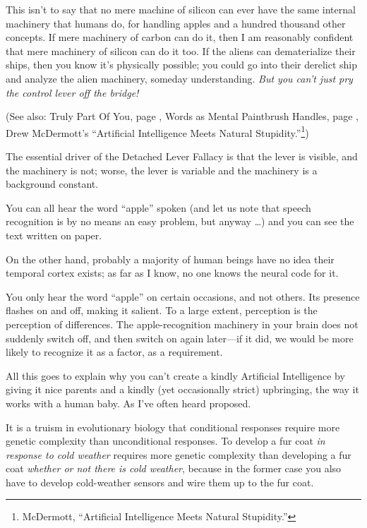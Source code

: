{
 This isn't to say that no mere machine of silicon
can ever have the same internal machinery that humans do, for handling
apples and a hundred thousand other concepts. If mere machinery of
carbon can do it, then I am reasonably confident that mere machinery of
silicon can do it too. If the aliens can dematerialize their ships,
then you know it's physically possible; you could go
into their derelict ship and analyze the alien machinery, someday
understanding. \textit{But you can't just pry the
control lever off the bridge!}}

{
 (See also: Truly Part Of You, page \pageref{truly_part_of_you}, Words as Mental Paintbrush Handles, page \pageref{words_as_mental_paintbrush_handles},
Drew McDermott's ``Artificial
Intelligence Meets Natural
Stupidity.''\footnote{McDermott, ``Artificial Intelligence Meets
Natural Stupidity.''})}

{
 The essential driver of the Detached Lever Fallacy is that the
lever is visible, and the machinery is not; worse, the lever is
variable and the machinery is a background constant.}

{
 You can all hear the word
``apple'' spoken (and let us note
that speech recognition is by no means an easy problem, but anyway
\ldots) and you can see the text written on paper.}

{
 On the other hand, probably a majority of human beings have no
idea their temporal cortex exists; as far as I know, no one knows the
neural code for it.}

{
 You only hear the word
``apple'' on certain occasions, and
not others. Its presence flashes on and off, making it salient. To a
large extent, perception is the perception of differences. The
apple-recognition machinery in your brain does not suddenly switch off,
and then switch on again later---if it did, we would be more likely to
recognize it as a factor, as a requirement.}

{
 All this goes to explain why you can't create a
kindly Artificial Intelligence by giving it nice parents and a kindly
(yet occasionally strict) upbringing, the way it works with a human
baby. As I've often heard proposed.}

{
 It is a truism in evolutionary biology that conditional responses
require more genetic complexity than unconditional responses. To
develop a fur coat \textit{in response to cold weather} requires more
genetic complexity than developing a fur coat \textit{whether or not
there is cold weather}, because in the former case you also have to
develop cold-weather sensors and wire them up to the fur coat.}

